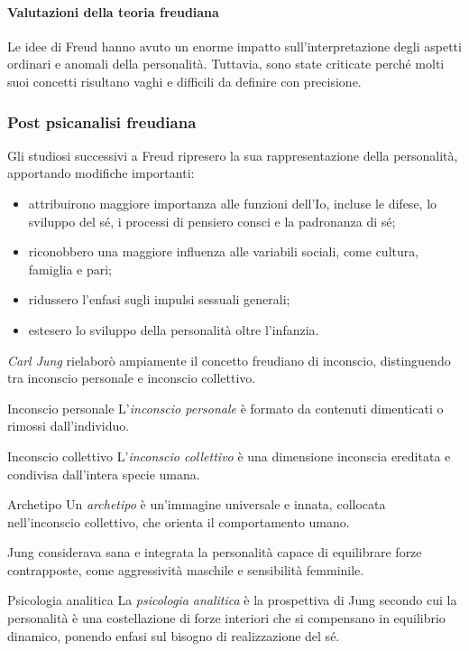 \documentclass[a4paper]{article}
\begin{document}
\paragraph{Valutazioni della teoria freudiana}
Le idee di Freud hanno avuto un enorme impatto sull'interpretazione degli aspetti ordinari e anomali della personalità. Tuttavia, sono state criticate perché molti suoi concetti risultano vaghi e difficili da definire con precisione.
\subsubsection{Post psicanalisi freudiana}
Gli studiosi successivi a Freud ripresero la sua rappresentazione della personalità, apportando modifiche importanti:
\begin{itemize}
    \item attribuirono maggiore importanza alle funzioni dell'Io, incluse le difese, lo sviluppo del sé, i processi di pensiero consci e la padronanza di sé;
    \item riconobbero una maggiore influenza alle variabili sociali, come cultura, famiglia e pari;
    \item ridussero l'enfasi sugli impulsi sessuali generali;
    \item estesero lo sviluppo della personalità oltre l'infanzia.
\end{itemize}
\emph{Carl Jung} rielaborò ampiamente il concetto freudiano di inconscio, distinguendo tra inconscio personale e inconscio collettivo.
\begin{snippetdefinition}{Inconscio personale}
    L'\emph{inconscio personale} è formato da contenuti dimenticati o rimossi dall'individuo.
\end{snippetdefinition}
\begin{snippetdefinition}{Inconscio collettivo}
    L'\emph{inconscio collettivo} è una dimensione inconscia ereditata e condivisa dall'intera specie umana.
\end{snippetdefinition}
\begin{snippetdefinition}{Archetipo}
    Un \emph{archetipo} è un'immagine universale e innata, collocata nell'inconscio collettivo, che orienta il comportamento umano.
\end{snippetdefinition}
Jung considerava sana e integrata la personalità capace di equilibrare forze contrapposte, come aggressività maschile e sensibilità femminile.
\begin{snippetdefinition}{Psicologia analitica}
    La \emph{psicologia analitica} è la prospettiva di Jung secondo cui la personalità è una costellazione di forze interiori che si compensano in equilibrio dinamico, ponendo enfasi sul bisogno di realizzazione del sé.
\end{snippetdefinition}
\end{document}
